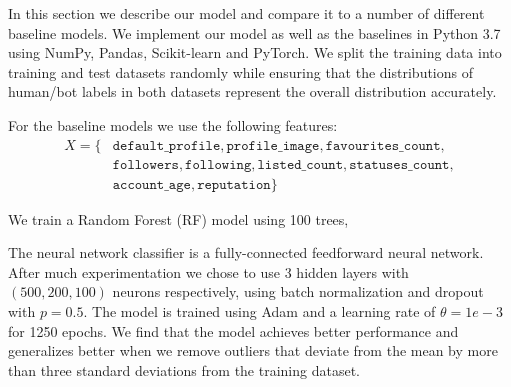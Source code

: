 In this section we describe our model and compare it to a number of different baseline models. We implement our model as well as the baselines in Python 3.7 using NumPy, Pandas, Scikit-learn and PyTorch. We split the training data into training and test datasets randomly while ensuring that the distributions of human/bot labels in both datasets represent the overall distribution accurately. 

For the baseline models we use the following features:
\begin{align*}
    X = \{ & \texttt{default\_profile}, \texttt{profile\_image}, \texttt{favourites\_count}, \\
    & \texttt{followers}, \texttt{following}, \texttt{listed\_count}, \texttt{statuses\_count}, \\
    & \texttt{account\_age}, \texttt{reputation} \}
\end{align*}

We train a Random Forest (RF) model using 100 trees, 

The neural network classifier is a fully-connected feedforward neural network. After much experimentation we chose to use 3 hidden layers with $(500, 200, 100)$ neurons respectively, using batch normalization and dropout with $p=0.5$. The model is trained using Adam and a learning rate of $\theta = 1e-3$ for 1250 epochs. We find that the model achieves better performance and generalizes better when we remove outliers that deviate from the mean by more than three standard deviations from the training dataset.

